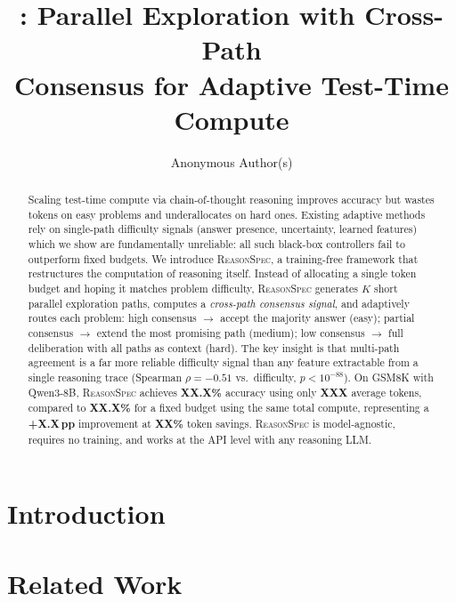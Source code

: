 \documentclass{article}
\title{\fullmethod{}: Parallel Exploration with Cross-Path\\Consensus for Adaptive Test-Time Compute}
\author{
  Anonymous Author(s)
}
\newcommand{\method}{\textsc{ReasonSpec}}
\theoremstyle{remark}
\begin{document}
\maketitle

\begin{abstract}
Scaling test-time compute via chain-of-thought reasoning improves accuracy but wastes tokens on easy problems and underallocates on hard ones.
Existing adaptive methods rely on single-path difficulty signals (answer presence, uncertainty, learned features) which we show are fundamentally unreliable: all such black-box controllers fail to outperform fixed budgets.
We introduce \method{}, a training-free framework that restructures the computation of reasoning itself.
Instead of allocating a single token budget and hoping it matches problem difficulty, \method{} generates $K$ short parallel exploration paths, computes a \emph{cross-path consensus signal}, and adaptively routes each problem:
high consensus $\rightarrow$ accept the majority answer (easy); partial consensus $\rightarrow$ extend the most promising path (medium); low consensus $\rightarrow$ full deliberation with all paths as context (hard).
The key insight is that multi-path agreement is a far more reliable difficulty signal than any feature extractable from a single reasoning trace (Spearman $\rho = -0.51$ vs.\ difficulty, $p < 10^{-88}$).
On GSM8K with Qwen3-8B, \method{} achieves \textbf{XX.X\%} accuracy using only \textbf{XXX} average tokens, compared to \textbf{XX.X\%} for a fixed budget using the same total compute, representing a \textbf{+X.X\,pp} improvement at \textbf{XX\%} token savings.
\method{} is model-agnostic, requires no training, and works at the API level with any reasoning LLM.
\end{abstract}

\section{Introduction}
\label{sec:intro}



\section{Related Work}
\label{sec:related}
\end{document}
